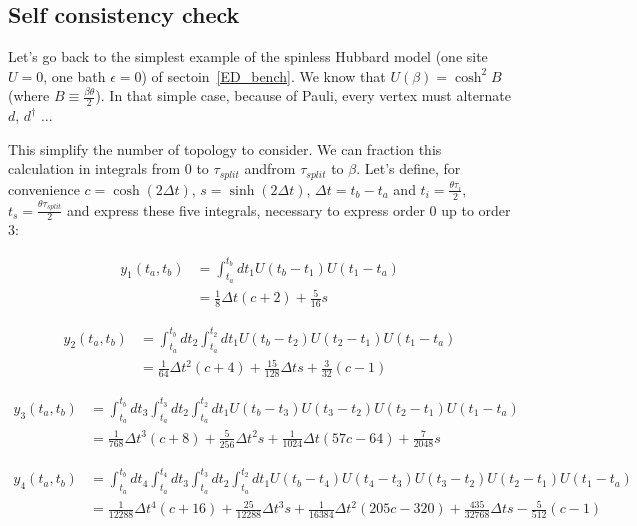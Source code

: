 \documentclass[10pt,letter]{article}
\begin{document}
\subsection{Self consistency check}

Let's go back to the simplest example of the spinless Hubbard model (one site $U=0$, one bath $\epsilon=0$) of sectoin~\ref{ED_bench}. We know that $U(\beta) = \cosh^2 B$ (where $B \equiv \frac{\beta\theta}{2}$). In that simple case, because of Pauli, every vertex must alternate $d$, $d^\dagger$ ...

This simplify the number of topology to consider. We can fraction this calculation in integrals from $0$ to $\tau_{split}$ andfrom $\tau_{split}$ to $\beta$. Let's define, for convenience $c = \cosh(2\Delta t)$, $s = \sinh(2\Delta t)$, $\Delta t = t_b - t_a$ and $t_i = \frac{\theta\tau_i}{2}$, $t_s = \frac{\theta\tau_{split}}{2}$ and express these five integrals, necessary to express order 0 up to order 3:

\begin{align}
  y_1 (t_a,t_b) &=
  \int_{t_a}^{t_b} dt_1   
  U(t_b-t_1) 
  U(t_1-t_a) 
  \\
  &=
  \frac{1}{8} \Delta t (c+2)
 +\frac{5}{16} s
\end{align}

\begin{align}
  y_2 (t_a,t_b) &=
  \int_{t_a}^{t_b} dt_2   
  \int_{t_a}^{t_2} dt_1 
  U(t_b-t_2) 
  U(t_2-t_1) 
  U(t_1-t_a) 
  \\
  &=
  \frac{1}{64} \Delta t^2 (c+4)
  +\frac{15}{128} \Delta t s
  +\frac{3}{32} (c-1)
\end{align}

\begin{align}
  y_3 (t_a,t_b) &=
  \int_{t_a}^{t_b} dt_3  
  \int_{t_a}^{t_3} dt_2 
  \int_{t_a}^{t_2} dt_1 
  U(t_b-t_3) 
  U(t_3-t_2) 
  U(t_2-t_1) 
  U(t_1-t_a) 
  \\
  &=
  \frac{1}{768} \Delta t^3 (c+8)
  +\frac{5}{256} \Delta t^2 s
  +\frac{1}{1024} \Delta t (57 c-64)
  +\frac{7}{2048} s
\end{align}

\begin{align}
  y_4 (t_a,t_b) &=
  \int_{t_a}^{t_b} dt_4 
  \int_{t_a}^{t_4} dt_3 
  \int_{t_a}^{t_3} dt_2 
  \int_{t_a}^{t_2} dt_1 
  U(t_b-t_4) 
  U(t_4-t_3) 
  U(t_3-t_2) 
  U(t_2-t_1) 
  U(t_1-t_a) 
  \\
  &=
    \frac{1}{12288} \Delta t^4 (c+16)
  +\frac{25}{12288} \Delta t^3 s
  +\frac{1}{16384} \Delta t^2 (205 c-320)
  +\frac{435}{32768} \Delta t s
  -\frac{5}{512} (c-1)
\end{align}
\end{document}
